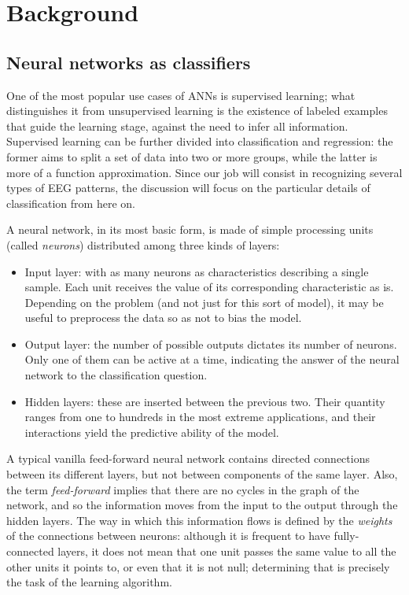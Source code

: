 \chapter{Background}\label{ch:background}

\section{Neural networks as classifiers}

	One of the most popular use cases of \acs{ANN}s is supervised learning; what distinguishes it from unsupervised learning is the existence of labeled examples that guide the learning stage, against the need to infer all information. Supervised learning can be further divided into classification and regression: the former aims to split a set of data into two or more groups, while the latter is more of a function approximation. Since our job will consist in recognizing several types of \acs{EEG} patterns, the discussion will focus on the particular details of classification from here on.

	A neural network, in its most basic form, is made of simple processing units (called \textit{neurons}) distributed among three kinds of layers:

	\begin{itemize}

		\item
		Input layer: with as many neurons as characteristics describing a single sample. Each unit receives the value of its corresponding characteristic as is. Depending on the problem (and not just for this sort of model), it may be useful to preprocess the data so as not to bias the model.

		\item
		Output layer: the number of possible outputs dictates its number of neurons. Only one of them can be active at a time, indicating the answer of the neural network to the classification question.

		\item
		Hidden layers: these are inserted between the previous two. Their quantity ranges from one to hundreds in the most extreme applications, and their interactions yield the predictive ability of the model.

	\end{itemize}

	A typical vanilla feed-forward neural network contains directed connections between its different layers, but not between components of the same layer. Also, the term \textit{feed-forward} implies that there are no cycles in the graph of the network, and so the information moves from the input to the output through the hidden layers. The way in which this information flows is defined by the \textit{weights} of the connections between neurons: although it is frequent to have fully-connected layers, it does not mean that one unit passes the same value to all the other units it points to, or even that it is not null; determining that is precisely the task of the learning algorithm.

